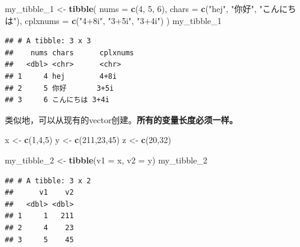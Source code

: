 \documentclass[]{book}
\newenvironment{Shaded}{\begin{snugshade}}{\end{snugshade}}
\newcommand{\DataTypeTok}[1]{\textcolor[rgb]{0.13,0.29,0.53}{#1}}
\newcommand{\DecValTok}[1]{\textcolor[rgb]{0.00,0.00,0.81}{#1}}
\newcommand{\KeywordTok}[1]{\textcolor[rgb]{0.13,0.29,0.53}{\textbf{#1}}}
\newcommand{\NormalTok}[1]{#1}
\newcommand{\StringTok}[1]{\textcolor[rgb]{0.31,0.60,0.02}{#1}}
\begin{document}
\begin{Shaded}
\begin{Highlighting}[]
\NormalTok{my_tibble_}\DecValTok{1}\NormalTok{ <-}\StringTok{ }\KeywordTok{tibble}\NormalTok{(}
                \DataTypeTok{nums =} \KeywordTok{c}\NormalTok{(}\DecValTok{4}\NormalTok{, }\DecValTok{5}\NormalTok{, }\DecValTok{6}\NormalTok{),}
                \DataTypeTok{chars =} \KeywordTok{c}\NormalTok{(}\StringTok{"hej"}\NormalTok{, }\StringTok{"你好"}\NormalTok{, }\StringTok{"こんにちは"}\NormalTok{),}
                \DataTypeTok{cplxnums =} \KeywordTok{c}\NormalTok{(}\StringTok{"4+8i"}\NormalTok{, }\StringTok{"3+5i"}\NormalTok{, }\StringTok{"3+4i"}\NormalTok{)}
\NormalTok{                )}
\NormalTok{my_tibble_}\DecValTok{1}
\end{Highlighting}
\end{Shaded}

\begin{verbatim}
## # A tibble: 3 x 3
##    nums chars      cplxnums
##   <dbl> <chr>      <chr>   
## 1     4 hej        4+8i    
## 2     5 你好       3+5i    
## 3     6 こんにちは 3+4i
\end{verbatim}

类似地，可以从现有的vector创建。\textbf{所有的变量长度必须一样。}

\begin{Shaded}
\begin{Highlighting}[]
\NormalTok{x <-}\StringTok{ }\KeywordTok{c}\NormalTok{(}\DecValTok{1}\NormalTok{,}\DecValTok{4}\NormalTok{,}\DecValTok{5}\NormalTok{)}
\NormalTok{y <-}\StringTok{ }\KeywordTok{c}\NormalTok{(}\DecValTok{211}\NormalTok{,}\DecValTok{23}\NormalTok{,}\DecValTok{45}\NormalTok{)}
\NormalTok{z <-}\StringTok{ }\KeywordTok{c}\NormalTok{(}\DecValTok{20}\NormalTok{,}\DecValTok{32}\NormalTok{)}
\end{Highlighting}
\end{Shaded}

\begin{Shaded}
\begin{Highlighting}[]
\NormalTok{my_tibble_}\DecValTok{2}\NormalTok{ <-}\StringTok{ }\KeywordTok{tibble}\NormalTok{(}\DataTypeTok{v1 =}\NormalTok{ x, }\DataTypeTok{v2 =}\NormalTok{ y)}
\NormalTok{my_tibble_}\DecValTok{2}
\end{Highlighting}
\end{Shaded}

\begin{verbatim}
## # A tibble: 3 x 2
##      v1    v2
##   <dbl> <dbl>
## 1     1   211
## 2     4    23
## 3     5    45
\end{verbatim}
\end{document}
